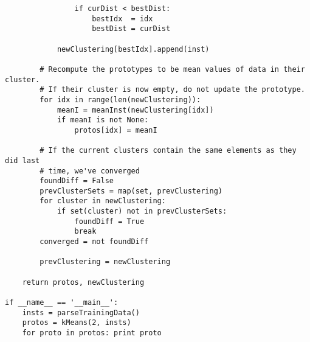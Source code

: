 \documentclass{article}
\begin{document}
\begin{verbatim}
                if curDist < bestDist:
                    bestIdx  = idx
                    bestDist = curDist

            newClustering[bestIdx].append(inst)

        # Recompute the prototypes to be mean values of data in their cluster.
        # If their cluster is now empty, do not update the prototype.
        for idx in range(len(newClustering)):
            meanI = meanInst(newClustering[idx])
            if meanI is not None:
                protos[idx] = meanI

        # If the current clusters contain the same elements as they did last
        # time, we've converged
        foundDiff = False
        prevClusterSets = map(set, prevClustering)
        for cluster in newClustering:
            if set(cluster) not in prevClusterSets:
                foundDiff = True
                break
        converged = not foundDiff

        prevClustering = newClustering

    return protos, newClustering

if __name__ == '__main__':
    insts = parseTrainingData()
    protos = kMeans(2, insts)
    for proto in protos: print proto

\end{verbatim}
\end{document}
